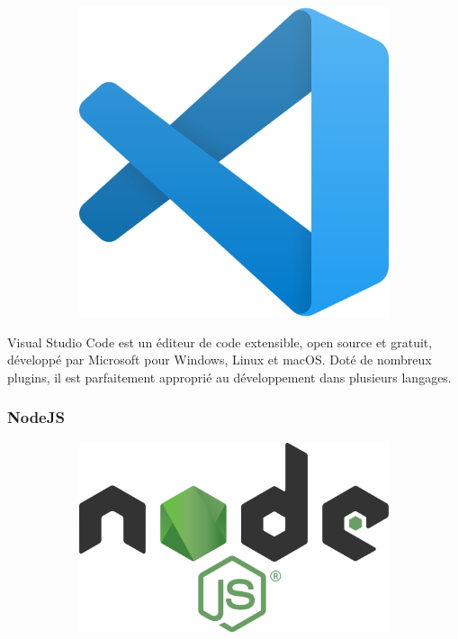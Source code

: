 \documentclass{article}
\begin{document}
\begin{figure}[h!]
	\centering
  	\begin{subfigure}[b]{0.1\linewidth}
    \includegraphics[width=\linewidth]{studio.png}
  	\end{subfigure}
\end{figure}

Visual Studio Code est un éditeur de code extensible, open source et gratuit, développé par Microsoft pour Windows, Linux et macOS. Doté de nombreux plugins, il est parfaitement approprié au développement dans plusieurs langages.

\subsubsection{NodeJS}

\begin{figure}[h!]
	\centering
  	\begin{subfigure}[b]{0.2\linewidth}
    \includegraphics[width=\linewidth]{Node.png}
  	\end{subfigure}
\end{figure}
\end{document}
